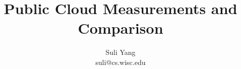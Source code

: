 \documentclass[letterpaper,twocolumn,10pt]{article}
\begin{document}
\title{\Large \bf Public Cloud Measurements and Comparison}

\author{
{\rm Suli Yang}\\
suli@cs.wisc.edu
} %

\maketitle






{}

\end{document}
